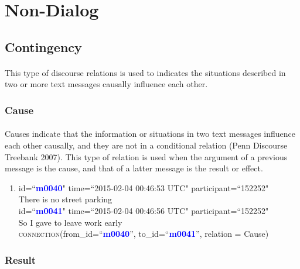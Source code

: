 \documentclass{article}
\begin{document}
\newpage
\section{Non-Dialog}

\subsection{Contingency}
\paragraph{}
This type of discourse relations is used to indicates the situations described in two or more text messages causally influence each other.

\subsubsection{Cause}
\paragraph{}
Causes indicate that the information or situations in two text messages influence each other causally, and they are not in a conditional relation (Penn Discourse Treebank 2007). This type of relation is used when the argument of a previous message is the cause, and that of a latter message is the result or effect. 
\begin{enumerate}[resume]
\item id=``\textbf{\textcolor{blue}{m0040}}" time=``2015-02-04 00:46:53 UTC" participant=``152252"\\
There is no street parking\\
id=``\textbf{\textcolor{blue}{m0041}}" time=``2015-02-04 00:46:56 UTC" participant=``152252"\\
So I gave to leave work early \\
\textsc{connection}(from\_id=``\textbf{\textcolor{blue}{m0040}}'', to\_id=``\textbf{\textcolor{blue}{m0041}}'', relation = Cause)\\
\end{enumerate}

\subsubsection{Result}
\end{document}
